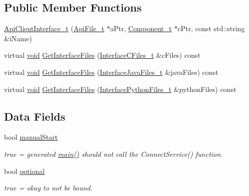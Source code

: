 \subsection*{Public Member Functions}
\begin{DoxyCompactItemize}
\item 
\hyperlink{structmodel_1_1_api_client_interface__t_a3faef690b34f5e84ae0de81a7771ef0b}{Api\+Client\+Interface\+\_\+t} (\hyperlink{structmodel_1_1_api_file__t}{Api\+File\+\_\+t} $\ast$a\+Ptr, \hyperlink{structmodel_1_1_component__t}{Component\+\_\+t} $\ast$c\+Ptr, const std\+::string \&i\+Name)
\item 
virtual \hyperlink{_t_e_m_p_l_a_t_e__cdef_8h_ac9c84fa68bbad002983e35ce3663c686}{void} \hyperlink{structmodel_1_1_api_client_interface__t_ad3b8a6fcc943f97374b8328adf4e82a4}{Get\+Interface\+Files} (\hyperlink{structmodel_1_1_interface_c_files__t}{Interface\+C\+Files\+\_\+t} \&c\+Files) const 
\item 
virtual \hyperlink{_t_e_m_p_l_a_t_e__cdef_8h_ac9c84fa68bbad002983e35ce3663c686}{void} \hyperlink{structmodel_1_1_api_client_interface__t_ad6c9ae23ac6f3170a4a5a445b82928fe}{Get\+Interface\+Files} (\hyperlink{structmodel_1_1_interface_java_files__t}{Interface\+Java\+Files\+\_\+t} \&java\+Files) const 
\item 
virtual \hyperlink{_t_e_m_p_l_a_t_e__cdef_8h_ac9c84fa68bbad002983e35ce3663c686}{void} \hyperlink{structmodel_1_1_api_client_interface__t_a327d005c5298a6fe2b43fb4e13cec41c}{Get\+Interface\+Files} (\hyperlink{structmodel_1_1_interface_python_files__t}{Interface\+Python\+Files\+\_\+t} \&python\+Files) const 
\end{DoxyCompactItemize}
\subsection*{Data Fields}
\begin{DoxyCompactItemize}
\item 
bool \hyperlink{structmodel_1_1_api_client_interface__t_ac8a50d991b8807b854d5a1a516e91b88}{manual\+Start}
\begin{DoxyCompactList}\small\item\em true = generated \hyperlink{start_8c_a3c04138a5bfe5d72780bb7e82a18e627}{main()} should not call the Connect\+Service() function. \end{DoxyCompactList}\item 
bool \hyperlink{structmodel_1_1_api_client_interface__t_aa3767aa67402c190a8fbc5d7202ff403}{optional}
\begin{DoxyCompactList}\small\item\em true = okay to not be bound. \end{DoxyCompactList}\end{DoxyCompactItemize}
